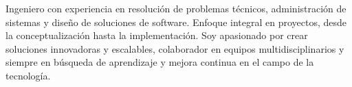 

\begin{cvparagraph}

Ingeniero con experiencia en resolución de problemas técnicos, administración de sistemas y diseño de soluciones de software. Enfoque integral en proyectos, desde la conceptualización hasta la implementación. Soy apasionado por crear soluciones innovadoras y escalables, colaborador en equipos multidisciplinarios y siempre en búsqueda de aprendizaje y mejora continua en el campo de la tecnología.
\end{cvparagraph}
